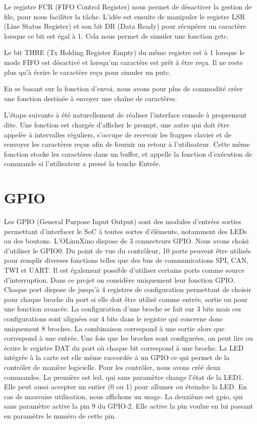 \documentclass[frenchb]{article}
\begin{document}
Le registre FCR (FIFO Control Register) nous permet de désactiver la gestion de file, pour nous faciliter la tâche.
L'idée est ensuite de manipuler le registre LSR (Line Status Register) et son bit DR (Data Ready) pour récupérer un caractère lorsque ce bit est égal à 1. Cela nous permet de simuler une fonction \textsf{getc}.

 Le bit THRE (Tx Holding Register Empty) du même registre est à 1 lorsque le mode FIFO est désactivé et lorsqu'un caractère est prêt à être reçu. Il ne reste plus qu'à écrire le caractère reçu pour simuler un \textsf{putc}.

En se basant sur la fonction d'envoi, nous avons pour plus de commodité créer une fonction destinée à envoyer une chaîne de caractères.

L'étape suivante à été naturellement de réaliser l'interface console à proprement dite. Une fonction est chargée d'afficher le prompt, une autre qui doit être appelée à intervalles réguliers, s'occupe de recevoir les frappes clavier et de renvoyer les caractères reçus afin de fournir un retour à l'utilisateur. Cette même fonction stocke les caractères dans un buffer, et appelle la fonction d'exécution de commande si l'utilisateur a pressé la touche Entrée.

%
\section{GPIO}
Les GPIO (General Purpose Input Output) sont des modules d'entrées sorties permettant d'interfacer le SoC à toutes sortes d'éléments, notamment des LEDs ou des boutons.
L'OLinuXino dispose de 3 connecteurs GPIO. Nous avons choisi d'utiliser le GPIO0. Du point de vue du contrôleur, 10 ports peuvent être utilisés pour remplir diverses fonctions telles que des bus de communications SPI, CAN, TWI et UART. Il est également possible d'utiliser certains ports comme source d'interruption. Dans ce projet on considère uniquement leur fonction GPIO.
Chaque port dispose de jusqu'à 4 registres de configuration permettant de choisir pour chaque broche du port si elle doit être utilisé comme entrée, sortie ou pour une fonction avancée.
La configuration d'une broche se fait sur 3 bits mais ces configurations sont alignées sur 4 bits dans le registre qui concerne donc uniquement 8 broches. La combinaison  correspond à une sortie alors que  correspond à une entrée.
Une fois que les broches sont configurées, on peut lire ou écrire le registre DAT du port où chaque bit correspond à une broche.
La LED intégrée à la carte est elle même raccordée à un GPIO ce qui permet de la contrôler de manière logicielle.
Pour les contrôler, nous avons créé deux commandes. La première est led, qui sans paramètre change l'état de la LED1. Elle peut aussi accepter un entier (0 ou 1) pour allumer ou éteindre la LED. En cas de mauvaise utilisation, nous affichons un usage. La deuxième est gpio, qui sans paramètre active la pin 9 du GPIO-2. Elle active la pin voulue en lui passant en paramètre le numéro de cette pin.
\end{document}
